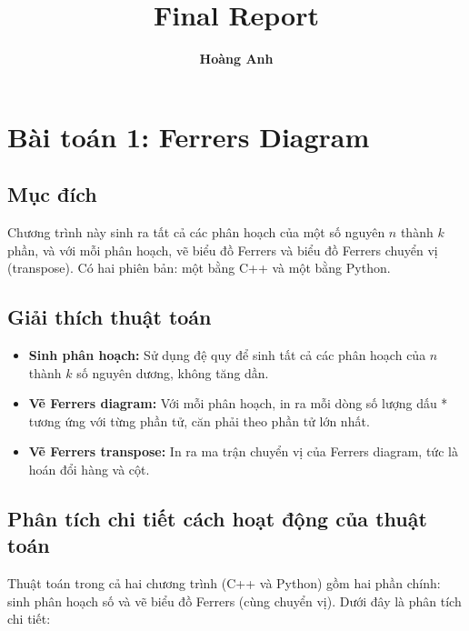 \documentclass[12pt]{article}
\title{\vspace{-1cm} \textbf{Final Report}}
\author{\textbf{Hoàng Anh}}
\begin{document}
\maketitle
\vspace{-1cm}


\section*{Bài toán 1: Ferrers Diagram}

\subsection*{Mục đích}
Chương trình này sinh ra tất cả các phân hoạch của một số nguyên $n$ thành $k$ phần, và với mỗi phân hoạch, vẽ biểu đồ Ferrers và biểu đồ Ferrers chuyển vị (transpose). Có hai phiên bản: một bằng C++ và một bằng Python.

\subsection*{Giải thích thuật toán}

\begin{itemize}
  \item \textbf{Sinh phân hoạch:} Sử dụng đệ quy để sinh tất cả các phân hoạch của $n$ thành $k$ số nguyên dương, không tăng dần.
  \item \textbf{Vẽ Ferrers diagram:} Với mỗi phân hoạch, in ra mỗi dòng số lượng dấu * tương ứng với từng phần tử, căn phải theo phần tử lớn nhất.
  \item \textbf{Vẽ Ferrers transpose:} In ra ma trận chuyển vị của Ferrers diagram, tức là hoán đổi hàng và cột.
\end{itemize}

\subsection*{Phân tích chi tiết cách hoạt động của thuật toán}
Thuật toán trong cả hai chương trình (C++ và Python) gồm hai phần chính: sinh phân hoạch số và vẽ biểu đồ Ferrers (cùng chuyển vị). Dưới đây là phân tích chi tiết:
\end{document}
